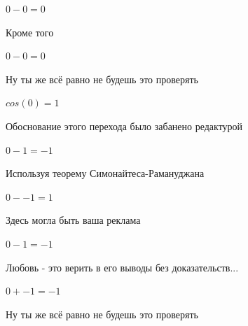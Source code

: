 \documentclass[12pt,a4paper,fleqn]{article}
\begin{document}
\begin{center}
\begin{center}
\begin{center}
\begin{center}
\begin{center}
\begin{center}
\begin{center}
\begin{center}
\begin{center}
\begin{center}
\begin{center}
\begin{center}
\begin{center}
\begin{center}
\begin{center}
\begin{center}
\begin{center}
\begin{center}
\begin{center}
\begin{center}
\begin{center}
\begin{center}
\begin{center}
\begin{center}
\begin{center}
\begin{center}
\begin{center}
\begin{center}
\begin{center}
\begin{center}
\begin{center}
\begin{center}
\begin{center}
\begin{center}
\begin{center}
\begin{center}
\begin{center}
\begin{center}
\begin{center}
\begin{center}
\begin{center}
\begin{center}
\begin{center}
\begin{center}
\begin{center}
\begin{center}
\begin{center}
\begin{center}$0-0 = 0$\end{center}
Кроме того

\begin{center}
\begin{center}$0-0 = 0$\end{center}
Ну ты же всё равно не будешь это проверять

\begin{center}
\begin{center}$cos(0) = 1$\end{center}
Обоснование этого перехода было забанено редактурой

\begin{center}
\begin{center}$0-1 = -1$\end{center}
Используя теорему Симонайтеса-Рамануджана

\begin{center}
\begin{center}$0--1 = 1$\end{center}
Здесь могла быть ваша реклама

\begin{center}
\begin{center}$0-1 = -1$\end{center}
Любовь - это верить в его выводы без доказательств...

\begin{center}
\begin{center}$0+-1 = -1$\end{center}
Ну ты же всё равно не будешь это проверять


\end{center}
\end{center}
\end{center}
\end{center}
\end{center}
\end{center}
\end{center}
\end{center}
\end{center}
\end{center}
\end{center}
\end{center}
\end{center}
\end{center}
\end{center}
\end{center}
\end{center}
\end{center}
\end{center}
\end{center}
\end{center}
\end{center}
\end{center}
\end{center}
\end{center}
\end{center}
\end{center}
\end{center}
\end{center}
\end{center}
\end{center}
\end{center}
\end{center}
\end{center}
\end{center}
\end{center}
\end{center}
\end{center}
\end{center}
\end{center}
\end{center}
\end{center}
\end{center}
\end{center}
\end{center}
\end{center}
\end{center}
\end{center}
\end{center}
\end{center}
\end{center}
\end{center}
\end{center}
\end{document}
